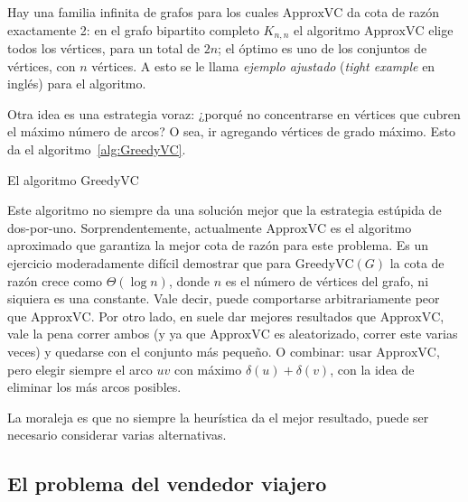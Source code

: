   Hay una familia infinita de grafos
  para los cuales \(\mathrm{ApproxVC}\) da cota de razón
  exactamente \num{2}:
  en el grafo bipartito completo \(K_{n, n}\)
  el algoritmo \(\mathrm{ApproxVC}\) elige todos los vértices,
  para un total de \(2 n\);
  el óptimo es uno de los conjuntos de vértices,
  con \(n\) vértices.
  A esto se le llama \emph{ejemplo ajustado}
  (\emph{\foreignlanguage{english}{tight example}} en inglés)
  para el algoritmo.

  Otra idea es una estrategia voraz:
  ¿porqué no concentrarse en vértices que cubren el máximo número de arcos?
  O sea,
  ir agregando vértices de grado máximo.
  Esto da el algoritmo~\ref{alg:GreedyVC}.
  \begin{algorithm}[ht]
    \DontPrintSemicolon\Indp

    \caption{El algoritmo \(\mathrm{GreedyVC}\)}
    \label{alg:GreedyVC}
  \end{algorithm}
  Este algoritmo no siempre da una solución mejor que la estrategia estúpida
  de dos-por-uno.
  Sorprendentemente,
  actualmente \(\mathrm{ApproxVC}\)
  es el algoritmo aproximado que garantiza la mejor cota de razón
  para este problema.
  Es un ejercicio moderadamente difícil demostrar
  que para \(\mathrm{GreedyVC}(G)\)
  la cota de razón crece como \(\Theta(\log n)\),
  donde \(n\) es el número de vértices del grafo,
  ni siquiera es una constante.
  Vale decir,
  puede comportarse arbitrariamente peor que \(\mathrm{ApproxVC}\).
  Por otro lado,
  en 
  suele dar mejores resultados que \(\mathrm{ApproxVC}\),
  vale la pena correr ambos
  (y ya que \(\mathrm{ApproxVC}\) es aleatorizado,
   correr este varias veces)
  y quedarse con el conjunto más pequeño.
  O combinar:
  usar \(\mathrm{ApproxVC}\),
  pero elegir siempre el arco \(u v\) con máximo \(\delta(u) + \delta(v)\),
  con la idea de eliminar los más arcos posibles.

  La moraleja es que no siempre la heurística 
  da el mejor resultado,
  puede ser necesario considerar varias alternativas.

\subsection{El problema del vendedor viajero}
\label{sec:vendedor-viajero}

